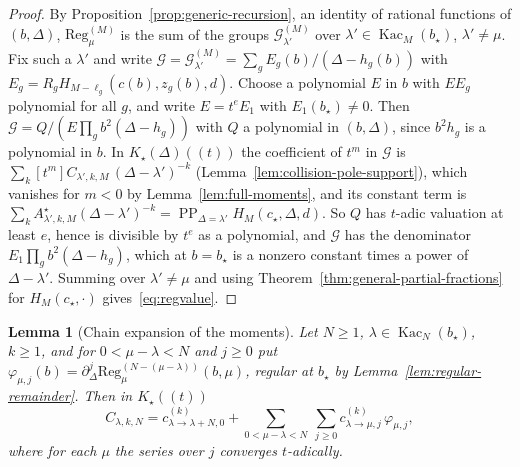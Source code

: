 \documentclass[twoside,10pt]{article}
\numberwithin{equation}{section}
\theoremstyle{slbody}
\newtheorem{lemma}[theorem]{Lemma}
\theoremstyle{definition}
\theoremstyle{remark}
\newcommand{\PP}{\operatorname{PP}}
\begin{document}
\begin{proof}
By Proposition~\ref{prop:generic-recursion}, an identity of rational
functions of $(b,\Delta)$, $\mathrm{Reg}^{(M)}_\mu$ is the sum of the groups
${\mathcal G}^{(M)}_{\lambda'}$ over $\lambda'\in\operatorname{Kac}_M(b_\star)$,
$\lambda'\neq\mu$.  Fix such a $\lambda'$ and write
${\mathcal G}={\mathcal G}^{(M)}_{\lambda'}=\sum_gE_g(b)/(\Delta-h_g(b))$ with
$E_g=R_gH_{M-\ell_g}(c(b),z_g(b),d)$.  Choose a polynomial $E$ in $b$ with
$EE_g$ polynomial for all $g$, and write $E=t^eE_1$ with $E_1(b_\star)\neq0$.
Then ${\mathcal G}=Q/(E\prod_gb^2(\Delta-h_g))$ with $Q$ a polynomial in
$(b,\Delta)$, since $b^2h_g$ is a polynomial in $b$.  In
$K_\star(\Delta)((t))$ the coefficient of $t^m$ in ${\mathcal G}$ is
$\sum_k[t^m]C_{\lambda',k,M}\,(\Delta-\lambda')^{-k}$
(Lemma~\ref{lem:collision-pole-support}), which vanishes for $m<0$ by
Lemma~\ref{lem:full-moments}, and its constant term is
$\sum_kA^\star_{\lambda',k,M}(\Delta-\lambda')^{-k}
=\PP_{\Delta=\lambda'}H_M(c_\star,\Delta,d)$.  So $Q$ has $t$-adic valuation
at least $e$, hence is divisible by $t^e$ as a polynomial, and ${\mathcal G}$ has the
denominator $E_1\prod_gb^2(\Delta-h_g)$, which at $b=b_\star$ is a nonzero
constant times a power of $\Delta-\lambda'$.  Summing over $\lambda'\neq\mu$
and using Theorem~\ref{thm:general-partial-fractions} for $H_M(c_\star,\cdot)$
gives~\eqref{eq:regvalue}.
\end{proof}

\begin{lemma}[Chain expansion of the moments]\label{lem:chain-expansion}
Let $N\geq1$, $\lambda\in\operatorname{Kac}_N(b_\star)$, $k\geq1$, and for
$0<\mu-\lambda<N$ and $j\geq0$ put
$\varphi_{\mu,j}(b)=\partial_\Delta^j\mathrm{Reg}^{(N-(\mu-\lambda))}_\mu(b,\mu)$,
regular at $b_\star$ by Lemma~\ref{lem:regular-remainder}.  Then in
$K_\star((t))$
\begin{equation}\label{eq:chain-expansion}
 C_{\lambda,k,N}=c^{(k)}_{\lambda\to\lambda+N,0}
 +\sum_{0<\mu-\lambda<N}\ \sum_{j\geq0}c^{(k)}_{\lambda\to\mu,j}\,\varphi_{\mu,j},
\end{equation}
where for each $\mu$ the series over $j$ converges $t$-adically.
\end{lemma}
\end{document}
